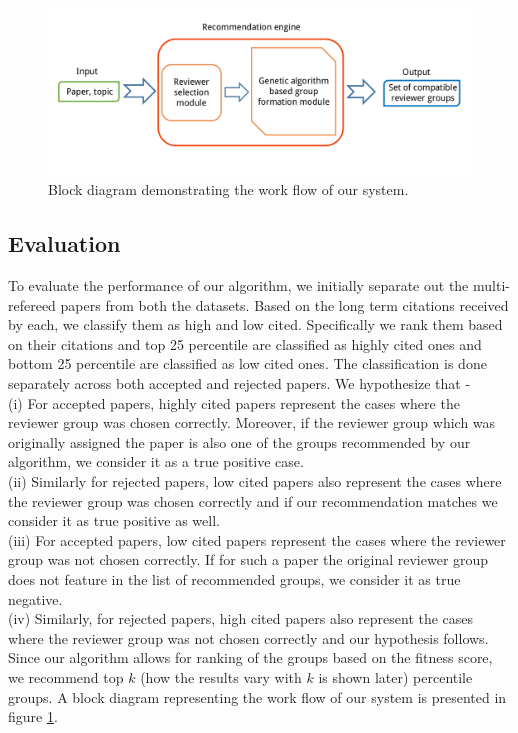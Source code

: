 \begin{figure}
\centering
\includegraphics[scale=0.32]{./texfiles/Chapter_4/cikm_17/figures/r_d_g.pdf}
\caption{\label{r_d_g} Block diagram demonstrating the work flow of our system.}
\end{figure}

\subsection{Evaluation}

To evaluate the performance of our algorithm, we initially separate out the multi-refereed papers from both the datasets. Based on the long term citations received by each, 
we classify them as high and low cited. Specifically we rank them based on their citations and top 25 percentile are classified as highly cited ones and bottom 25 percentile 
are classified as low cited ones. The classification is done separately across both accepted and rejected papers. We hypothesize that - \\
(i) For accepted papers, highly cited papers represent the cases where the reviewer group was chosen correctly. Moreover, if the reviewer group which was originally assigned 
the paper is also one of the groups recommended by our algorithm, we consider it as a true positive case.\\
(ii) Similarly for rejected papers, low cited papers also represent the cases where the reviewer group was chosen correctly and if our recommendation matches we consider 
it as true positive as well.\\
(iii) For accepted papers, low cited papers represent the cases where the reviewer group was not chosen correctly. If for such a paper the original reviewer group does not feature in the 
list of recommended groups, we consider it as true negative. \\ 
(iv) Similarly, for rejected papers, high cited papers also represent the cases where the reviewer group was not chosen correctly and our hypothesis follows. \\
Since our algorithm allows for ranking of the groups based on the fitness score, we recommend top $k$ (how the results vary with $k$ is shown later) percentile groups. A block diagram representing the work flow of our system is presented in figure \ref{r_d_g}.

